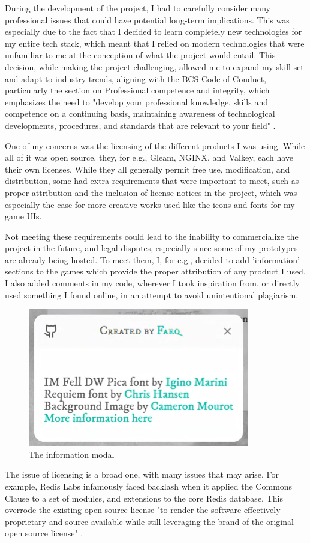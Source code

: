 \documentclass[]{final}
\begin{document}
During the development of the project, I had to carefully consider many
professional issues that could have potential long-term implications.
This was especially due to the fact that I decided to learn completely
new technologies for my entire tech stack, which meant that I relied
on modern technologies that were unfamiliar to me at the conception of what
the project would entail. This decision, while making the project challenging,
allowed me to expand my skill set and adapt to industry trends,
aligning with the BCS Code of Conduct, particularly the section on
Professional competence and integrity, which emphasizes the need to
"develop your professional knowledge, skills and competence on a continuing
basis, maintaining awareness of technological developments, procedures,
and standards that are relevant to your field" \cite{noauthor_bcs_nodate}.


One of my concerns was the licensing of the different products I was using.
While all of it was open source, they, for e.g., Gleam, NGINX, and Valkey,
each have their own licenses.
While they all generally permit free use, modification, and distribution,
some had extra requirements that were important to meet,
such as proper attribution and the inclusion of license notices in
the project, which was especially the case for more creative works used
like the icons and fonts for my game UIs.

Not meeting these requirements
could lead to the inability to commercialize the project
in the future, and legal disputes, especially since some of my prototypes are
already being hosted. To meet them, I, for e.g., decided to add 'information' sections to
the games which provide the proper attribution of any product I used. I
also added comments in my code, wherever I took inspiration from, or directly
used something I found online, in an attempt to avoid unintentional plagiarism.


\begin{figure}[H]
  \centering
  \includegraphics[width=.3\linewidth]{info_modal.png}
  \caption{The information modal}
\end{figure}

The issue of licensing is a broad one, with many issues that may arise.
For example, Redis Labs infamously faced backlash when it applied
the Commons Clause to a set of modules, and extensions to the core Redis database.
This overrode the existing open source license "to render the
software effectively proprietary and source available while still leveraging
the brand of the original open source license" \cite{ogrady_post-valkey_2024}.
\end{document}

